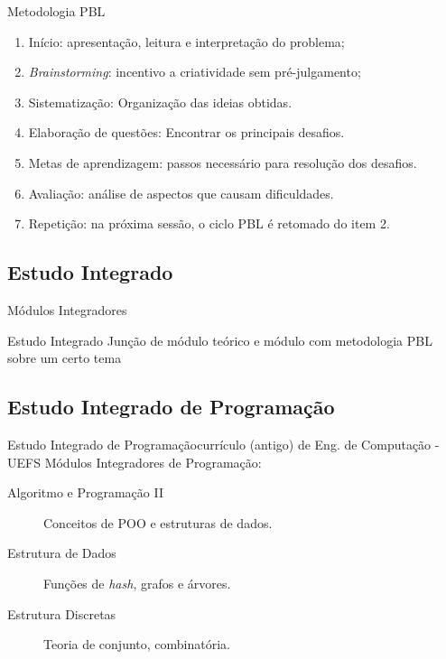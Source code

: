 \documentclass{beamer}
\begin{document}
\begin{frame}{Metodologia PBL}
  \begin{enumerate}
  \item {
    Início: apresentação, leitura e interpretação do problema;
    \pause %
  }
  \item {   
    \textit{Brainstorming}: incentivo a criatividade sem pré-julgamento;
    \pause
  }
  \item {
    Sistematização: Organização das ideias obtidas.
    \pause
  }
  \item{
    Elaboração de questões: Encontrar os principais desafios.
    \pause
  }
  \item {
    Metas de aprendizagem: passos necessário para resolução dos desafios.
    \pause
  }
  \item{
    Avaliação: análise de aspectos que causam dificuldades.
    \pause
  }
  \item{
    Repetição: na próxima sessão, o ciclo PBL é retomado do item 2. 
  }
  \end{enumerate}
\end{frame}

\subsection{Estudo Integrado}

\begin{frame}{Módulos Integradores}
\begin{block}{Estudo Integrado}
Junção de módulo teórico e módulo com metodologia PBL sobre um certo tema
\end{block}
\end{frame}

\subsection{Estudo Integrado de Programação}
\begin{frame}{Estudo Integrado de Programação}{currículo (antigo) de Eng. de Computação - UEFS}
    Módulos Integradores de Programação:
    \begin{description}
    \item[Algoritmo e Programação II] Conceitos de POO e estruturas de dados.
    \item[Estrutura de Dados] Funções de \textit{hash}, grafos e árvores.
    \item[Estrutura Discretas] Teoria de conjunto, combinatória.
    \end{description}
\end{frame} 
\end{document}
